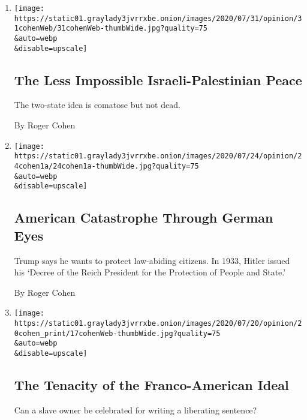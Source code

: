 \begin{enumerate}
\def\labelenumi{\arabic{enumi}.}
\item
  \href{/2020/07/31/opinion/israeli-palestinian-peace.html}{}

  \texttt{[image: https://static01.graylady3jvrrxbe.onion/images/2020/07/31/opinion/31cohenWeb/31cohenWeb-thumbWide.jpg?quality=75\\\&auto=webp\\\&disable=upscale]}

  \hypertarget{the-less-impossible-israeli-palestinian-peace}{%
  \subsection{The Less Impossible Israeli-Palestinian
  Peace}\label{the-less-impossible-israeli-palestinian-peace}}

  The two-state idea is comatose but not dead.

  By Roger Cohen
\item
  \href{/2020/07/24/opinion/trump-germany.html}{}

  \texttt{[image: https://static01.graylady3jvrrxbe.onion/images/2020/07/24/opinion/24cohen1a/24cohen1a-thumbWide.jpg?quality=75\\\&auto=webp\\\&disable=upscale]}

  \hypertarget{american-catastrophe-through-german-eyes}{%
  \subsection{American Catastrophe Through German
  Eyes}\label{american-catastrophe-through-german-eyes}}

  Trump says he wants to protect law-abiding citizens. In 1933, Hitler
  issued his `Decree of the Reich President for the Protection of People
  and State.'

  By Roger Cohen
\item
  \href{/2020/07/17/opinion/france-america-thomas-jefferson-race.html}{}

  \texttt{[image: https://static01.graylady3jvrrxbe.onion/images/2020/07/20/opinion/20cohen\_print/17cohenWeb-thumbWide.jpg?quality=75\\\&auto=webp\\\&disable=upscale]}

  \hypertarget{the-tenacity-of-the-franco-american-ideal}{%
  \subsection{The Tenacity of the Franco-American
  Ideal}\label{the-tenacity-of-the-franco-american-ideal}}

  Can a slave owner be celebrated for writing a liberating sentence?


\end{enumerate}
